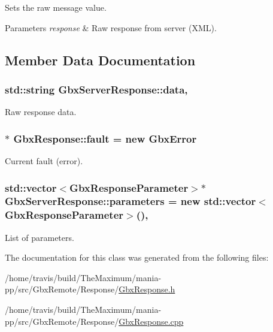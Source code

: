 Sets the raw message value. 


\begin{DoxyParams}{Parameters}
{\em response} & Raw response from server (X\-M\-L). \\
\hline
\end{DoxyParams}


\subsection{Member Data Documentation}
\hypertarget{classGbxServerResponse_a91567866239d733819125c3b3b9948c6}{
\subsubsection[{data}]{\setlength{\rightskip}{0pt plus 5cm}std\-::string Gbx\-Server\-Response\-::data\hspace{0.3cm}{\ttfamily [protected]}, {\ttfamily [inherited]}}}\label{classGbxServerResponse_a91567866239d733819125c3b3b9948c6}


Raw response data. 

\hypertarget{classGbxResponse_ad896e7447681008320ad9945b57a92ad}{
\subsubsection[{fault}]{$\ast$ Gbx\-Response\-::fault = new {\bf Gbx\-Error}\hspace{0.3cm}{\ttfamily [private]}}}\label{classGbxResponse_ad896e7447681008320ad9945b57a92ad}


Current fault (error). 

\hypertarget{classGbxServerResponse_ad6fef5319c4da9461f4cd0d72d8b5ee8}{
\subsubsection[{parameters}]{\setlength{\rightskip}{0pt plus 5cm}std\-::vector$<${\bf Gbx\-Response\-Parameter}$>$$\ast$ Gbx\-Server\-Response\-::parameters = new std\-::vector$<${\bf Gbx\-Response\-Parameter}$>$()\hspace{0.3cm}{\ttfamily [protected]}, {\ttfamily [inherited]}}}\label{classGbxServerResponse_ad6fef5319c4da9461f4cd0d72d8b5ee8}


List of parameters. 



The documentation for this class was generated from the following files\-:\begin{DoxyCompactItemize}
\item 
/home/travis/build/\-The\-Maximum/mania-\/pp/src/\-Gbx\-Remote/\-Response/\hyperlink{GbxResponse_8h}{Gbx\-Response.\-h}\item 
/home/travis/build/\-The\-Maximum/mania-\/pp/src/\-Gbx\-Remote/\-Response/\hyperlink{GbxResponse_8cpp}{Gbx\-Response.\-cpp}\end{DoxyCompactItemize}
